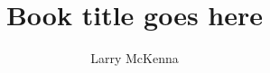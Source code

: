 \documentclass[amstex,12pt]{book}
\begin{document}
\title{Book title goes here}
\author{Larry McKenna}









\end{document}
